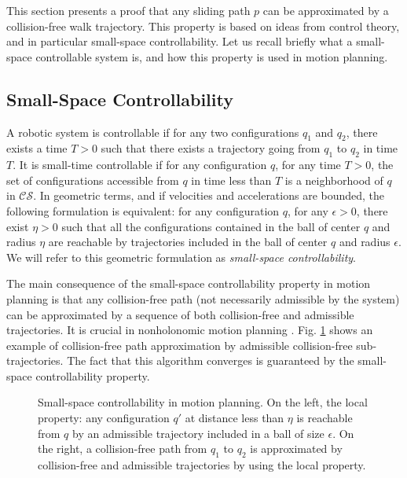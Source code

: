\documentclass{article}
\begin{document}
\label{sec:ssc}

This  section presents a proof that  any sliding path
$p$  can be approximated  by a  collision-free walk  trajectory.  This
property is based on ideas from control theory, and in
particular small-space  controllability. Let  us recall briefly  what a
small-space controllable  system is, and  how this property is  used in
motion planning.

\subsection{Small-Space Controllability}

A  robotic system  is  controllable  if  for any two  configurations
$q_1$ and $q_2$,  there exists  a  time  $T>0$ such  that  there exists  a
trajectory  going  from  $q_1$ to  $q_2$  in  time  $T$.  It  is  
small-time  controllable if for  any configuration  $q$, for  any time
$T>0$, the set of configurations accessible from $q$ in time less than
$T$ is a  neighborhood of $q$ in $\mathcal{CS}$.  In geometric terms,
and if velocities and accelerations are bounded, the following formulation is
equivalent:
for any  configuration $q$, for any $\epsilon >0$, there
exist $\eta >0$ such that all the configurations contained in the ball of center
$q$ and radius $\eta$ are reachable by trajectories included in the
ball of center $q$ and radius $\epsilon$.
We will refer to this geometric 
formulation as {\it small-space controllability}. 

The main  consequence of  the small-space controllability property  
in  motion planning  is that  any
collision-free path (not necessarily  admissible by the system) can be
approximated  by  a sequence  of  both  collision-free and  admissible
trajectories.  It is  crucial  in  nonholonomic  motion  planning
\cite{laumond1998robot}. Fig. \ref{fig:stc} shows an example of collision-free 
path approximation by admissible collision-free sub-trajectories. The fact 
that this algorithm  converges is guaranteed by the small-space
controllability property.

\begin{figure}
  \centering

  \begin{minipage}{3cm}
    
  \end{minipage}
  \begin{minipage}{4cm}
    
  \end{minipage}
  
  \caption{Small-space controllability in motion planning. On the left,
    the local property: any configuration $q'$ at distance less than
    $\eta$ is reachable from $q$ by an admissible trajectory included in
    a ball of size $\epsilon$. On the right, a collision-free path from
    $q_1$ to $q_2$ is approximated by collision-free and admissible
    trajectories by using the local property.
  }
  \label{fig:stc}
\end{figure}
\end{document}
